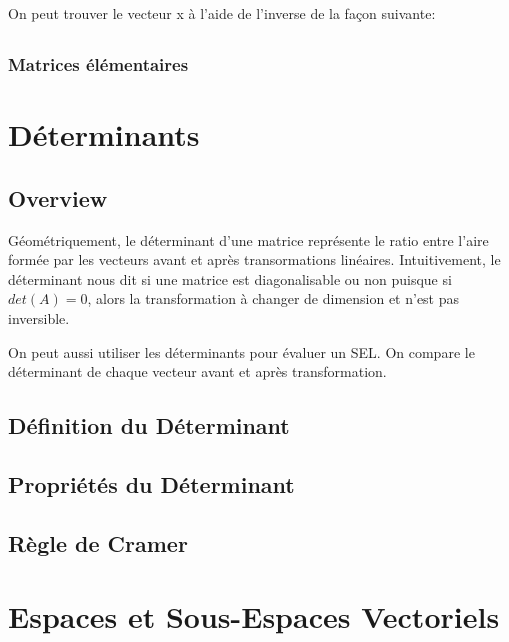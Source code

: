 \documentclass{article}
\begin{document}
On peut trouver le vecteur x à l'aide de l'inverse de la façon suivante:
\begin{multline}
\end{multline}


\subsubsection{Matrices élémentaires}






\pagebreak
\section{Déterminants}
\subsection{Overview}

Géométriquement, le déterminant d'une matrice représente le ratio entre l'aire
formée par les vecteurs avant et après transormations linéaires. Intuitivement,
le déterminant nous dit si une matrice est diagonalisable ou non puisque si
$det(A)=0$, alors la transformation à changer de dimension et n'est pas inversible.

On peut aussi utiliser les déterminants pour évaluer un SEL. On compare le déterminant
de chaque vecteur avant et après transformation.

\subsection{Définition du Déterminant}
\subsection{Propriétés du Déterminant}
\subsection{Règle de Cramer}

\pagebreak

\section{Espaces et Sous-Espaces Vectoriels}
\end{document}
